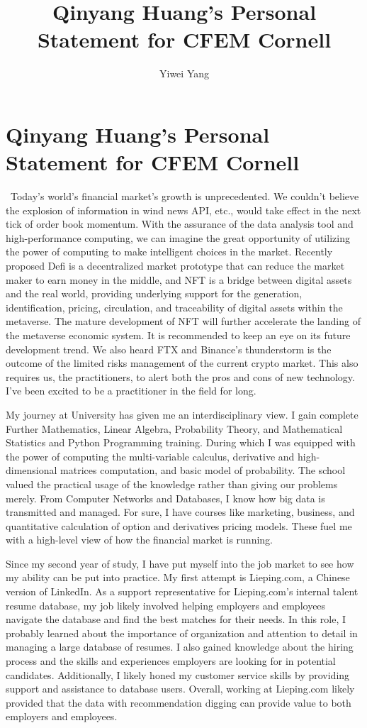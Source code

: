 \documentclass[a4paper,english]{article}
\title{Qinyang Huang's Personal Statement for CFEM Cornell}
\author{Yiwei Yang}
\def\centersec#1{\centering#1} %
\begin{document}
\section*{\centersec{Qinyang Huang's Personal Statement for CFEM Cornell}}
\quad\ Today's world's financial market's growth is unprecedented. We couldn't believe the explosion of information in wind news API, etc., would take effect in the next tick of order book momentum. With the assurance of the data analysis tool and high-performance computing, we can imagine the great opportunity of utilizing the power of computing to make intelligent choices in the market. Recently proposed Defi is a decentralized market prototype that can reduce the market maker to earn money in the middle, and NFT is a bridge between digital assets and the real world, providing underlying support for the generation, identification, pricing, circulation, and traceability of digital assets within the metaverse. The mature development of NFT will further accelerate the landing of the metaverse economic system. It is recommended to keep an eye on its future development trend. We also heard FTX and Binance's thunderstorm is the outcome of the limited risks management of the current crypto market. This also requires us, the practitioners, to alert both the pros and cons of new technology. I've been excited to be a practitioner in the field for long.

My journey at University has given me an interdisciplinary view. I gain complete Further Mathematics, Linear Algebra, Probability Theory, and Mathematical Statistics and Python Programming training. During which I was equipped with the power of computing the multi-variable calculus, derivative and high-dimensional matrices computation, and basic model of probability. The school valued the practical usage of the knowledge rather than giving our problems merely. From Computer Networks and Databases, I know how big data is transmitted and managed. For sure, I have courses like marketing, business, and quantitative calculation of option and derivatives pricing models. These fuel me with a high-level view of how the financial market is running.

Since my second year of study, I have put myself into the job market to see how my ability can be put into practice. My first attempt is Lieping.com, a Chinese version of LinkedIn. As a support representative for Lieping.com's internal talent resume database, my job likely involved helping employers and employees navigate the database and find the best matches for their needs. In this role, I probably learned about the importance of organization and attention to detail in managing a large database of resumes. I also gained knowledge about the hiring process and the skills and experiences employers are looking for in potential candidates. Additionally, I likely honed my customer service skills by providing support and assistance to database users. Overall, working at Lieping.com likely provided that the data with recommendation digging can provide value to both employers and employees. 
\end{document}

